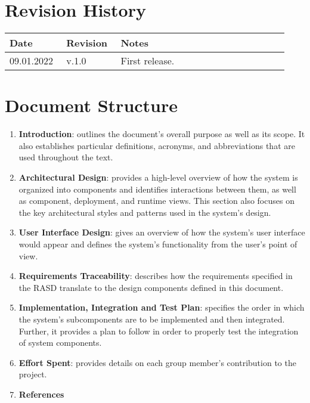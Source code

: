 \section{Revision History}

\begin{center}
	\begin{longtable}{@{}p{0.18\linewidth} p{0.18\linewidth} p{0.57\linewidth}@{}}
		\toprule
		\textbf{Date}   & \textbf{Revision} & \textbf{Notes}\\
		\midrule
        09.01.2022      & v.1.0             & First release.\\
		\bottomrule
	\end{longtable}
\end{center}

\printbibliography[title={Reference Documents},keyword=intro, heading=subbibnumbered]

\section{Document Structure}

\begin{enumerate}
    \item \textbf{Introduction}: outlines the document's overall purpose as well as its scope. It also establishes particular definitions, acronyms, and abbreviations that are used throughout the text.
    \item \textbf{Architectural Design}: provides a high-level overview of how the system is organized into components and identifies interactions between them, as well as component, deployment, and runtime views. This section also focuses on the key architectural styles and patterns used in the system's design.
    \item \textbf{User Interface Design}: gives an overview of how the system's user interface would appear and defines the system's functionality from the user's point of view.
    \item \textbf{Requirements Traceability}: describes how the requirements specified in the RASD translate to the design components defined in this document.
    \item \textbf{Implementation, Integration and Test Plan}: specifies the order in which the system's subcomponents are to be implemented and then integrated. Further, it provides a plan to follow in order to properly test the integration of system components.
    \item \textbf{Effort Spent}: provides details on each group member's contribution to the project.
    \item \textbf{References}
\end{enumerate}

